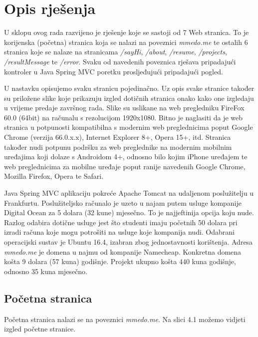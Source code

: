 \documentclass[times, utf8, zavrsni, numeric]{fer}
\begin{document}
\chapter{Opis rješenja}
\qquad U sklopu ovog rada razvijeno je rješenje koje se sastoji od 7 Web stranica.
To je korijenska (početna) stranica koja se nalazi na poveznici \textit{mmedo.me} te ostalih 6 stranica koje se nalaze na stranicama \textit{/sayHi}, \textit{/about}, \textit{/resume}, \textit{/projects}, \textit{/resultMessage} te \textit{/error}.
Svaku od navedenih poveznica rješava pripadajući kontroler u Java Spring MVC poretku prosljeđujući pripadajući pogled.

\qquad U nastavku opisujemo svaku stranicu pojedinačno. Uz opis svake stranice također su priložene slike koje prikazuju izgled dotičnih stranica onako kako one izgledaju u vrijeme predaje završnog rada.
Slike su uslikane na web pregledniku FireFox 60.0 (64bit) na računalu s rezolucijom 1920x1080.
Bitno je naglasiti da je web stranica u potpunosti kompatibilna s modernim web preglednicima poput Google Chrome (verzija 66.0.x.x), Internet Explorer 8+, Opera 15+, itd.
Stranica također nudi potpunu podršku za web preglednike na modernim mobilnim uređajima koji dolaze s Androidom 4+, odnosno bilo kojim iPhone uređajem te web preglednicima za mobilne uređaje poput ranije navedenih Google Chrome, Mozilla Firefox, Opera te Safari.

\qquad Java Spring MVC aplikaciju pokreće Apache Tomcat na udaljenom poslužitelju u Frankfurtu.
Poslužiteljsko računalo je uzeto u najam putem usluge kompanije Digital Ocean za 5 dolara (32 kune) mjesečno.
To je najjeftinija opcija koju nude.
Razlog odabira dotične usluge jest što studenti imaju početnih 50 dolara pri izradi računa koje mogu potrošiti na usluge koje kompanija nudi.
Odabrani operacijski sustav je Ubuntu 16.4, izabran zbog jednostavnosti korištenja.
Adresa \textit{mmedo.me} je domena u najmu od kompanije Namecheap.
Konkretna domena košta 9 dolara (57 kuna) godišnje.
Projekt ukupno košta 440 kuna godišnje, odnosno 35 kuna mjesečno.

\pagebreak
\section{Početna stranica}
\qquad Početna stranica nalazi se na poveznici \textit{mmedo.me}. Na slici 4.1 možemo vidjeti izgled početne stranice.
\end{document}
